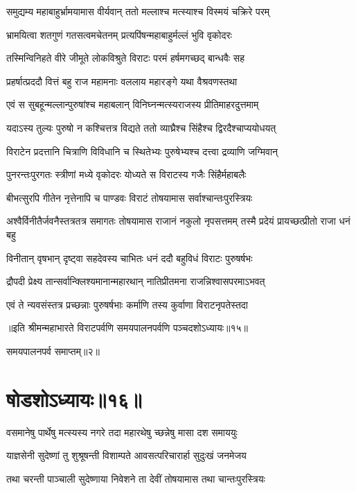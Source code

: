 \twolineshloka
{समुद्यम्य महाबाहुर्भ्रामयामास वीर्यवान्}
{ततो मल्लाश्च मत्स्याश्च विस्मयं चक्रिरे परम्}


\twolineshloka
{भ्रामयित्वा शतगुणं गतसत्वमचेतनम्}
{प्रत्यपिंषन्महाबाहुर्मल्लं भुवि वृकोदरः}


\twolineshloka
{तस्मिन्विनिहते वीरे जीमूते लोकविश्रुते}
{विराटः परमं हर्षमगच्छद् बान्धवैः सह}


\twolineshloka
{प्रहर्षात्प्रददौ वित्तं बहु राज महामनाः}
{वललाय महारङ्गे यथा वैश्रवणस्तथा}


\twolineshloka
{एवं स सुबहून्मल्लान्पुरुषांश्च महाबलान्}
{विनिघ्नन्मत्स्यराजस्य प्रीतिमाहरदुत्तमाम्}


\twolineshloka
{यदाऽस्य तुल्यः पुरुषो न कश्चित्तत्र विद्यते}
{ततो व्याघ्रैश्च सिंहैश्च द्विरदैश्चाप्ययोधयत्}


\twolineshloka
{विराटेन प्रदत्तानि चित्राणि विविधानि च}
{स्थितेभ्यः पुरुषेभ्यश्च दत्त्वा द्रव्याणि जग्मिवान्}


\twolineshloka
{पुनरन्तःपुरगतः स्त्रीणां मध्ये वृकोदरः}
{योध्यते स विराटस्य गजैः सिंहैर्महाबलैः}


\twolineshloka
{बीभत्सुरपि गीतेन नृत्तेनापि च पाण्डवः}
{विराटं तोषयामास सर्वाश्चान्तःपुरस्त्रियः}


\threelineshloka
{अश्वैर्विनीतैर्जवनैस्तत्रतत्र समागतः}
{तोषयामास राजानं नकुलो नृपसत्तमम्}
{तस्मै प्रदेयं प्रायच्छत्प्रीतो राजा धनं बहु}


\twolineshloka
{विनीतान् वृषभान् दृष्ट्वा सहदेवस्य चाभितः}
{धनं ददौ बहुविधं विराटः पुरुषर्षभः}


\twolineshloka
{द्रौपदी प्रेक्ष्य तान्सर्वान्क्लिश्यमानान्महारथान्}
{नातिप्रीतमना राजन्निश्वासपरमाऽभवत्}


\twolineshloka
{एवं ते न्यवसंस्तत्र प्रच्छन्नाः पुरुषर्षभाः}
{कर्माणि तस्य कुर्वाणा विराटनृपतेस्तदा}

॥इति श्रीमन्महाभारते विराटपर्वणि समयपालनपर्वणि पञ्चदशोऽध्यायः॥१५॥ 

समयपालनपर्व समाप्तम्॥२॥

\chapter{षोडशोऽध्यायः॥१६॥}

\twolineshloka
{वसमानेषु पार्थेषु मत्स्यस्य नगरे तदा}
{महारथेषु च्छन्नेषु मासा दश समाययुः}


\twolineshloka
{याज्ञसेनी सुदेष्णां तु शुश्रूषन्ती विशाम्पते}
{आवसत्परिचारार्हा सुदुःखं जनमेजय}


\twolineshloka
{तथा चरन्ती पाञ्चाली सुदेष्णाया निवेशने}
{ता देवीं तोषयामास तथा चान्तःपुरस्त्रियः}


